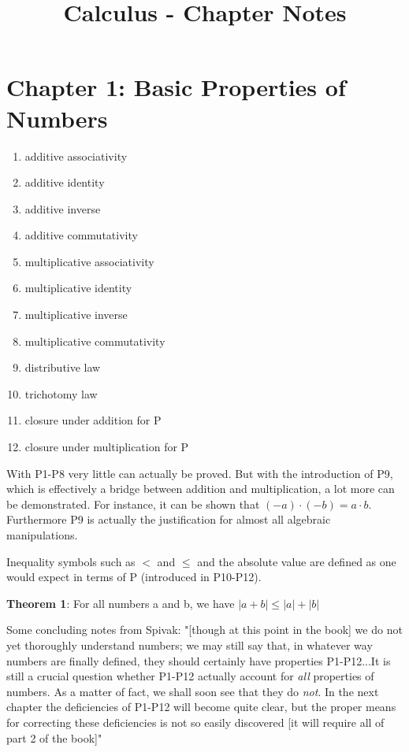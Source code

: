 \documentclass{article}
\begin{document}
\title{Calculus - Chapter Notes}
\author{}
\date{}
\maketitle

\section{Chapter 1: Basic Properties of Numbers}

\begin{enumerate}
	\item additive associativity
	\item additive identity
	\item additive inverse
	\item additive commutativity
	\item multiplicative associativity
	\item multiplicative identity
	\item multiplicative inverse
	\item multiplicative commutativity
	\item distributive law
	\item trichotomy law
	\item closure under addition for P
	\item closure under multiplication for P
\end{enumerate}

\begin{flushleft}
With P1-P8 very little can actually be proved. But with the introduction of P9, which is effectively a bridge between addition and multiplication, a lot more can be demonstrated. For instance, it can be shown that $(-a) \cdot (-b) = a \cdot b$. Furthermore P9 is actually the justification for almost all algebraic manipulations.
\end{flushleft}

\begin{flushleft}
Inequality symbols such as $<$ and $\leq$ and the absolute value are defined as one would expect in terms of P (introduced in P10-P12).
\end{flushleft}

\textbf{Theorem 1}: For all numbers a and b, we have $ |a+b| \leq |a|+|b| $

\begin{flushleft}
Some concluding notes from Spivak: "[though at this point in the book] we do not yet thoroughly understand numbers; we may still say that, in whatever way numbers are finally defined, they should certainly have properties P1-P12...It is still a crucial question whether P1-P12 actually account for \textit{all} properties of numbers. As a matter of fact, we shall soon see that they do \textit{not}. In the next chapter the deficiencies of P1-P12 will become quite clear, but the proper means for correcting these deficiencies is not so easily discovered [it will require all of part 2 of the book]"
\end{flushleft}
\end{document}
